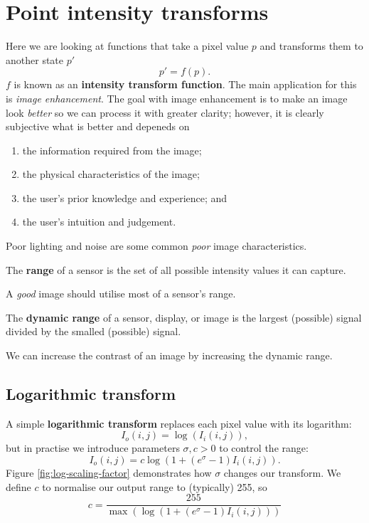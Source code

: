 \chapter{Point intensity transforms}

Here we are looking at functions that take a pixel value $p$ and transforms them to another state $p'$
\[ p' = f(p). \]
$f$ is known as an \textbf{intensity transform function}.
The main application for this is \emph{image enhancement}.
The goal with image enhancement is to make an image look \emph{better} so we can process it with greater clarity;
however, it is clearly subjective what is better and depeneds on
\begin{enumerate}
    \item the information required from the image;
    \item the physical characteristics of the image;
    \item the user's prior knowledge and experience; and
    \item the user's intuition and judgement.
\end{enumerate}

Poor lighting and noise are some common \emph{poor} image characteristics.

\begin{definition}[Range]
    The \textbf{range} of a sensor is the set of all possible intensity values it can capture.
\end{definition}

A \emph{good} image should utilise most of a sensor's range.

\begin{definition}
    The \textbf{dynamic range} of a sensor, display, or image 
    is the largest (possible) signal divided by the smalled (possible) signal.
\end{definition}

We can increase the contrast of an image by increasing the dynamic range.

\section{Logarithmic transform}

A simple \textbf{logarithmic transform} replaces each pixel value with its logarithm:
\[ I_o(i,j) = \log{(I_i(i,j))}, \]
but in practise we introduce parameters $\sigma, c > 0$ to control the range:
\[ I_o(i, j) = c\log{\left(1 + (e^\sigma - 1)I_i(i, j)\right)}. \]
Figure \ref{fig:log-scaling-factor} demonstrates how $\sigma$ changes our transform.
We define $c$ to normalise our output range to (typically) 255, so
\[ c = \frac{255}{\max{(\log{(1 + (e^\sigma - 1)I_i(i, j))})}} \]

